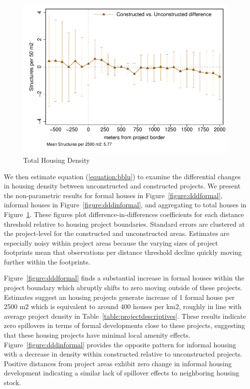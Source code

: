 \documentclass[12pt]{article}
\begin{document}
\begin{figure}
\caption{Total Housing Density}\label{figure:dddtotal}
\centering
\includegraphics[scale=.8]{figures/distplotDDD_bblu_total_buildings_admin.pdf}
\end{figure}

We then estimate equation (\ref{equation:bblu}) to examine the differential changes in housing density between unconstructed and constructed projects.  We present the non-parametric results for formal houses in Figure~\ref{figure:dddformal}, informal houses in Figure~\ref{figure:dddinformal}, and aggregating to total houses in Figure~\ref{figure:dddtotal}.  These figures plot difference-in-differences coefficients for each distance threshold relative to housing project boundaries.  Standard errors are clustered at the project-level for the constructed and unconstructed areas.  Estimates are especially noisy within project areas because the varying sizes of project footprints mean that observations per distance threshold decline quickly moving further within the footprints.

Figure~\ref{figure:dddformal} finds a substantial increase in formal houses within the project boundary which abruptly shifts to zero moving outside of these projects.  Estimates suggest an housing projects generate increase of 1 formal house per 2500 m2 which is equivalent to around 400 houses per km2, roughly in line with average project density in Table~\ref{table:projectdescriptives}.  These results indicate zero spillovers in terms of formal developments close to these projects, suggesting that these housing projects have minimal local amenity effects.  Figure~\ref{figure:dddinformal} provides the opposite pattern for informal housing with a decrease in density within constructed relative to unconstructed projects.  Positive distances from project areas exhibit zero change in informal housing development indicating a similar lack of spillover effects to neighboring housing stock.  
\end{document}
